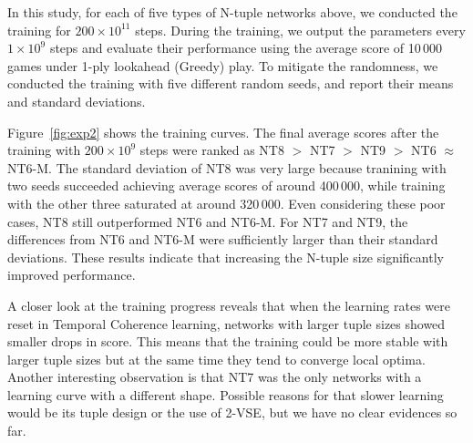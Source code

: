 In this study, for each of five types of N-tuple networks above, we conducted the training for $200 \times 10^{11}$ steps.  During the training, we output the parameters every $1 \times 10^9$ steps and evaluate their performance using the average score of 10\,000 games under 1-ply lookahead (Greedy) play.
To mitigate the randomness, we conducted the training with five different random seeds, and report their means and standard deviations.

Figure~\ref{fig:exp2} shows the training curves.
The final average scores after the training with $200 \times 10^9$ steps were ranked as NT8 $>$ NT7 $>$ NT9 $>$ NT6 $\approx$ NT6-M.
The standard deviation of NT8 was very large because tranining with two seeds succeeded achieving average scores of around 400\,000, while training with the other three saturated at around 320\,000.
Even considering these poor cases, NT8 still outperformed NT6 and NT6-M.
For NT7 and NT9, the differences from NT6 and NT6-M were sufficiently larger than their standard deviations.
These results indicate that increasing the N-tuple size significantly improved performance.

A closer look at the training progress reveals that when the learning rates were reset in Temporal Coherence learning, networks with larger tuple sizes showed smaller drops in score. This means that the training could be more stable with larger tuple sizes but at the same time they tend to converge local optima.
Another interesting observation is that NT7 was the only networks with a learning curve with a different shape.  Possible reasons for that slower learning would be its tuple design or the use of 2-VSE, but we have no clear evidences so far.

